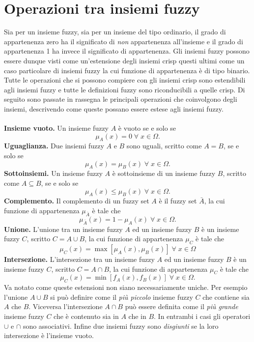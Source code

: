 \documentclass [11pt,a4paper,twoside,openright] {book}
\begin{document}
\section{Operazioni tra insiemi fuzzy}
Sia per un insieme fuzzy, sia per un insieme del tipo ordinario, il grado di appartenenza zero ha il significato di \textit{non} appartenenza all'insieme e il grado di appartenenza 1 ha invece il significato di appartenenza. Gli insiemi fuzzy possono essere dunque visti come un'estensione degli insiemi crisp questi ultimi come un caso particolare di insiemi fuzzy la cui funzione di appartenenza è di tipo binario. Tutte le operazioni che si possono compiere con gli insiemi crisp sono estendibili agli insiemi fuzzy e tutte le definizioni fuzzy sono riconducibili a quelle crisp. Di seguito sono passate in rassegna le principali operazioni che coinvolgono degli insiemi, descrivendo come queste possano essere estese agli insiemi fuzzy.\\\\
\textbf{Insieme vuoto.} Un insieme fuzzy $A$ è vuoto se e solo se
\[ \mu_A(x) = 0 \; \forall \; x \in \Omega.\] 
\textbf{Uguaglianza.} Due insiemi fuzzy $A$ e $B$ sono uguali, scritto come $A=B$, se e solo se
\[ \mu_A(x) = \mu_B(x) \; \forall \; x \in \Omega.\] 
\textbf{Sottoinsiemi.} Un insieme fuzzy $A$ è sottoinsieme di un insieme fuzzy $B$, scritto come $A \subseteq B$, se e solo se
\[ \mu_A(x) \leq \mu_B(x) \; \forall \; x \in \Omega.\] 
\textbf{Complemento.} Il complemento di un fuzzy set $A$ è il fuzzy set $\bar{A}$, la cui funzione di appartenenza $\mu_{\bar{A}}$ è tale che
\[ \mu_{\bar{A}}(x) = 1-\mu_A(x) \; \forall \; x \in \Omega.\] 
\textbf{Unione.} L'unione tra un insieme fuzzy $A$ ed un insieme fuzzy $B$ è un insieme fuzzy $C$, scritto $C=A \cup B$, la cui funzione di appartenenza $\mu_C$ è tale che
\[ \mu_C(x) = \max[\mu_A(x), \mu_B(x)] \; \forall \; x \in \Omega\] 
\textbf{Intersezione.} L'intersezione tra un insieme fuzzy $A$ ed un insieme fuzzy $B$ è un insieme fuzzy $C$, scritto $C=A \cap B$, la cui funzione di appartenenza $\mu_C$ è tale che
\[ \mu_C(x) = \min[f_A(x), f_B(x)] \; \forall \; x \in \Omega.\] 
Va notato come queste estensioni non siano necessariamente uniche. Per esempio l'unione $A \cup B$ si può definire come il \textit{più piccolo} insieme fuzzy $C$ che contiene sia $A$ che $B$. Viceversa l'intersezione $A \cap B$ può essere definita come il \textit{più grande} insieme fuzzy $C$ che è contenuto sia in $A$ che in $B$. In entrambi i casi gli operatori $\cup$ e $\cap$ sono associativi. Infine due insiemi fuzzy sono \textit{disgiunti} se la loro intersezione è l'insieme vuoto.
\end{document}
